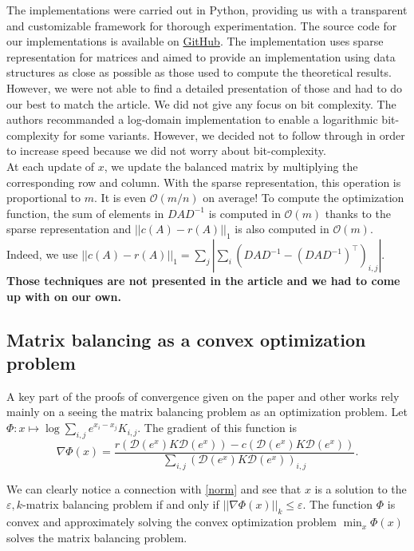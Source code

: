 The implementations were carried out in Python, providing us with a transparent and customizable framework for thorough experimentation. The source code for our implementations is available on \href{https://github.com/alexicanesse/Near-linear-convergence-of-the-Random-Osborne-algorithm-for-Matrix-Balancing}{GitHub}. The implementation uses sparse representation for matrices and aimed to provide an implementation using data structures as close as possible as those used to compute the theoretical results. However, we were not able to find a detailed presentation of those and had to do our best to match the article. We did not give any focus on bit complexity. The authors recommanded a log-domain implementation to enable a logarithmic bit-complexity for some variants. However, we decided not to follow through in order to increase speed because we did not worry about bit-complexity.\\

At each update of \(x\), we update the balanced matrix by multiplying the corresponding row and column. With the sparse representation, this operation is proportional to \(m\). It is even \(\mathcal O(m/n)\) on average! To compute the optimization function, the sum of elements in \(DAD^{-1}\) is computed in \(\mathcal O (m)\) thanks to the sparse representation and \(||c(A) - r(A)||_1\) is also computed in \(\mathcal O(m)\). Indeed, we use \(||c(A) - r(A)||_1 = \sum_j \left| \sum_i (DAD^{-1} - (DAD^{-1})^\top)_{i,j}\right|\). \textbf{Those techniques are not presented in the article and we had to come up with on our own.}\\

\subsection{Matrix balancing as a convex optimization problem}

A key part of the proofs of convergence given on the paper and other works rely mainly on a seeing the matrix balancing problem as an optimization problem. Let \(\Phi : x \mapsto \log \sum_{i,j} e^{x_i - x_j} K_{i,j}\). The gradient of this function is 
\[
    \nabla \Phi (x) = \dfrac{r\left( \mathcal D(e^x)K\mathcal D(e^{x}) \right) - c\left( \mathcal D(e^x)K\mathcal D(e^{x}) \right)}{\sum_{i,j}\left( \mathcal D(e^x)K\mathcal D(e^{x}) \right)_{i,j}}.    
\]

We can clearly notice a connection with \cref{norm} and see that \(x\) is a solution to the \(\varepsilon, k\)-matrix balancing problem if and only if \(||\nabla \Phi(x)||_k \leq \varepsilon\). The function \(\Phi\) is convex and approximately solving the convex optimization problem \(\min_x \Phi(x)\) solves the matrix balancing problem.\\

